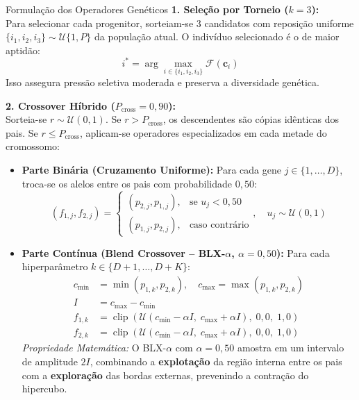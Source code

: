 \documentclass[11pt,a4paper]{article}
\begin{document}
\begin{mathBox}{Formulação dos Operadores Genéticos}
\textbf{1. Seleção por Torneio ($k = 3$):}\\
Para selecionar cada progenitor, sorteiam-se 3 candidatos com reposição uniforme $\{i_1, i_2, i_3\} \sim \mathcal{U}\{1, P\}$ da população atual. O indivíduo selecionado é o de maior aptidão:
\begin{equation}
  i^* = \arg\max_{i \in \{i_1, i_2, i_3\}} \mathcal{F}(\mathbf{c}_i)
\end{equation}
Isso assegura pressão seletiva moderada e preserva a diversidade genética.

\textbf{2. Crossover Híbrido ($P_{\text{cross}} = 0{,}90$):}\\
Sorteia-se $r \sim \mathcal{U}(0, 1)$. Se $r > P_{\text{cross}}$, os descendentes são cópias idênticas dos pais. Se $r \le P_{\text{cross}}$, aplicam-se operadores especializados em cada metade do cromossomo:
\begin{itemize}
  \item \textbf{Parte Binária (Cruzamento Uniforme):} Para cada gene $j \in \{1, \dots, D\}$, troca-se os alelos entre os pais com probabilidade $0{,}50$:
  \begin{equation}
    (f_{1, j}, f_{2, j}) = \begin{cases} (p_{2, j}, p_{1, j}), & \text{se } u_j < 0{,}50 \\ (p_{1, j}, p_{2, j}), & \text{caso contrário} \end{cases}, \quad u_j \sim \mathcal{U}(0, 1)
  \end{equation}
  \item \textbf{Parte Contínua (Blend Crossover -- BLX-$\alpha$, $\alpha = 0{,}50$):} Para cada hiperparâmetro $k \in \{D+1, \dots, D+K\}$:
  \begin{align}
    c_{\min} &= \min(p_{1, k}, p_{2, k}), \quad c_{\max} = \max(p_{1, k}, p_{2, k}) \\
    I &= c_{\max} - c_{\min} \\
    f_{1, k} &= \operatorname{clip}\left( \mathcal{U}(c_{\min} - \alpha I, \; c_{\max} + \alpha I), \; 0{,}0, \; 1{,}0 \right) \\
    f_{2, k} &= \operatorname{clip}\left( \mathcal{U}(c_{\min} - \alpha I, \; c_{\max} + \alpha I), \; 0{,}0, \; 1{,}0 \right)
  \end{align}
  \textit{Propriedade Matemática:} O BLX-$\alpha$ com $\alpha = 0{,}50$ amostra em um intervalo de amplitude $2I$, combinando a \textbf{explotação} da região interna entre os pais com a \textbf{exploração} das bordas externas, prevenindo a contração do hipercubo.
\end{itemize}


\end{mathBox}
\end{document}
